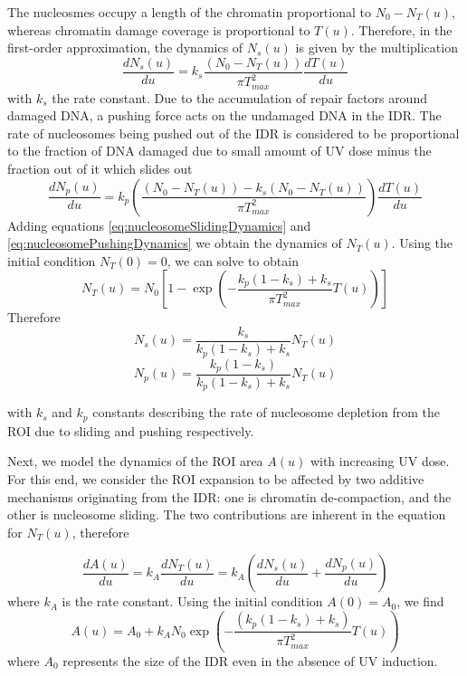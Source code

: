 \documentclass[12pt]{article}
\begin{document}
The nucleosmes occupy a length of the chromatin proportional to $N_0-N_T(u)$, whereas chromatin damage coverage is proportional to $T(u)$. Therefore, in the first-order approximation, the dynamics of $N_s(u)$ is given by the multiplication 
\begin{equation}\label{eq:nucleosomeSlidingDynamics}
\frac{dN_s(u)}{du}=k_s\frac{(N_0-N_T(u))}{\pi T_{max}^2}\frac{dT(u)}{du}
\end{equation}
with $k_s$ the rate constant. Due to the accumulation of repair factors around damaged DNA, a pushing force acts on the undamaged DNA in the IDR. The rate of nucleosomes being pushed out of the IDR is considered to be proportional to the fraction of DNA damaged due to small amount of UV dose minus the fraction out of it which slides out 
\begin{equation}\label{eq:nucleosomePushingDynamics}
\frac{dN_p(u)}{du}=k_p\left( \frac{(N_0-N_T(u))-k_s(N_0-N_T(u))}{\pi T_{max}^2}\right) \frac{dT(u)}{du} 
\end{equation}
Adding equations \ref{eq:nucleosomeSlidingDynamics} and \ref{eq:nucleosomePushingDynamics} we obtain the dynamics of $N_T(u)$. Using the initial condition $N_T(0)=0$, we can solve to obtain 
\begin{equation}
N_T(u)=N_0\left[1-\exp\left(-\frac{k_p(1-k_s)+k_s}{\pi T_{max}^2}T(u)\right)\right]
\end{equation}
Therefore 
\begin{equation}\label{eq:nucleosomeSliding}
N_s(u) = \frac{k_s}{k_p(1-k_s)+k_s}N_T(u)
\end{equation}
\begin{equation}\label{eq:nucleosomePushed}
N_p(u)=\frac{k_p(1-k_s)}{k_p(1-k_s)+k_s}N_T(u)
\end{equation}

with $k_s$ and $k_p$ constants describing the rate of nucleosome depletion from the ROI due to sliding and pushing respectively. 

Next, we model the dynamics of the ROI area $A(u)$ with increasing UV dose.  For this end, we consider the ROI expansion to be affected by two additive mechanisms originating from the IDR: one is chromatin de-compaction, and the other is nucleosome sliding. The two contributions are inherent in the equation for $N_T(u)$, therefore 

\begin{equation}\label{dralpha}
\frac{dA(u)}{du}=k_A\frac{dN_T(u)}{du}= k_A\left(\frac{dN_s(u)}{du}+\frac{dN_p(u)}{du}\right)
\end{equation}
where $k_A$ is the rate constant. Using the initial condition $A(0)=A_0$, we find 
\begin{equation}\label{eq:RoiArea}
A(u) = A_0 +k_AN_0\exp\left(-\frac{(k_p(1-k_s)+k_s)}{\pi T_{max}^2}T(u)\right)
\end{equation}
where $A_0$ represents the size of the IDR even in the absence of UV induction.
\end{document}
